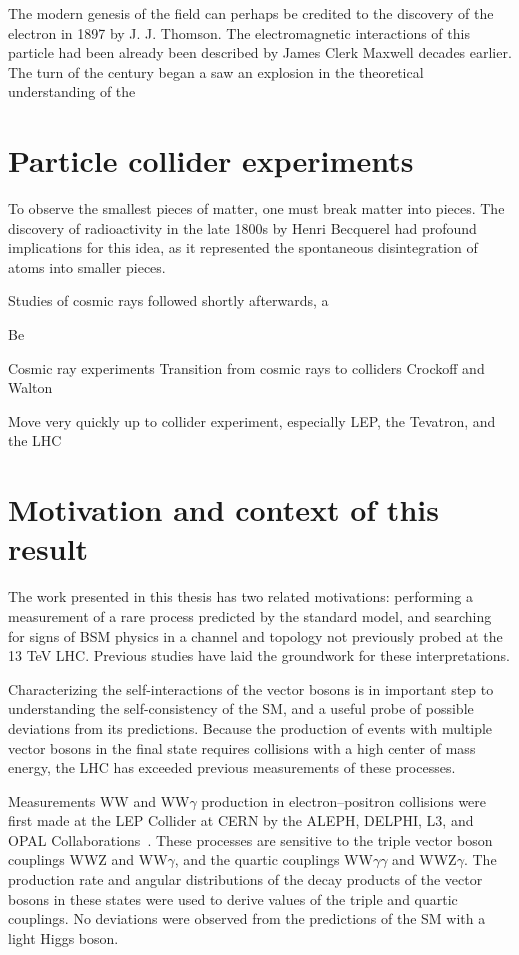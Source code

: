The modern genesis of the field can perhaps be credited to 
the discovery of the electron in 1897 by J. J. Thomson.
The electromagnetic interactions of this particle had been 
already been described by James Clerk Maxwell decades earlier.
The turn of the century began a saw an explosion in the theoretical
understanding of the 

\section{Particle collider experiments}

To observe the smallest pieces of matter, one must break matter into pieces.
The discovery of radioactivity in the late 1800s by Henri Becquerel had
profound implications for this idea, as it represented the spontaneous
disintegration of atoms into smaller pieces.

Studies of cosmic rays followed shortly afterwards, a


Be

Cosmic ray experiments
Transition from cosmic rays to colliders
Crockoff and Walton

Move very quickly up to collider experiment, especially LEP,
the Tevatron, and the LHC
\section{Motivation and context of this result}
The work presented in this thesis
has two related motivations: performing a measurement of a rare
process predicted by the standard model, and searching for signs of 
BSM physics in a channel and topology not previously probed at the 13 TeV LHC.
Previous studies have laid the groundwork for these interpretations.

Characterizing the self-interactions of the vector bosons is in important
step to understanding the self-consistency of the SM, and a useful probe
of possible deviations from its predictions. Because the production of events
with multiple vector bosons in the final state
requires collisions with a high center of mass energy, the LHC has
exceeded previous measurements of these processes.

Measurements WW and WW$\gamma$ production in electron--positron collisions
were first made at the LEP
Collider at CERN by the ALEPH, DELPHI, L3, and OPAL Collaborations~\cite{LEP-2}.
These processes are sensitive to the triple vector boson couplings
WWZ and WW$\gamma$, and the quartic couplings WW$\gamma\gamma$
and WWZ$\gamma$. The production rate and angular distributions of the decay
products of the vector bosons in these states were used to derive values 
of the triple and quartic couplings. No deviations were observed from the 
predictions of the SM with a light Higgs boson.

